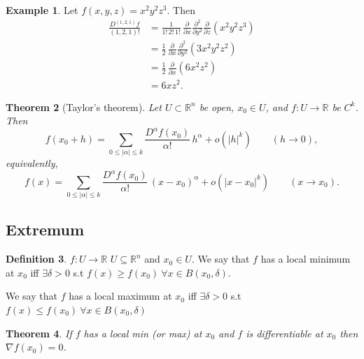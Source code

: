 \documentclass[11pt,a4paper]{article}
\theoremstyle{definition}
\newtheorem{definition}{Definition}[section]
\newtheorem{example}[definition]{Example}
\theoremstyle{plain}
\newtheorem{theorem}[definition]{Theorem}
\theoremstyle{remark}
\newcommand{\R}{\mathbb{R}}
\begin{document}
\begin{example}
Let $f(x,y,z)=x^2y^2z^3$. Then
\begin{align*}
\frac{D^{(1,2,1)}f}{(1,2,1)!}
&=\frac{1}{1!\,2!\,1!}\,
\frac{\partial}{\partial x}\frac{\partial^2}{\partial y^2}\frac{\partial}{\partial z}(x^2y^2z^3)\\
&=\frac{1}{2}\,\frac{\partial}{\partial x}\frac{\partial^2}{\partial y^2}(3x^2y^2z^2)\\
&=\frac{1}{2}\,\frac{\partial}{\partial x}(6x^2z^2)\\
&=6xz^2.
\end{align*}
\end{example}

\begin{theorem}[Taylor's theorem]
Let $U\subset\R^n$ be open, $x_0\in U$, and $f:U\to\R$ be $C^k$. Then
\[
f(x_0+h)=\sum_{0\le |\alpha|\le k}\frac{D^\alpha f(x_0)}{\alpha!}\,h^\alpha
+o(|h|^k)
\qquad (h\to 0),
\]
equivalently,
\[
f(x)=\sum_{0\le |\alpha|\le k}\frac{D^\alpha f(x_0)}{\alpha!}\,(x-x_0)^\alpha
+o(|x-x_0|^k)
\qquad (x\to x_0).
\]
\end{theorem}

\subsection{Extremum}
\begin{definition}
    $f \colon U \to \R$ $U \subseteq \R^n$ and $x_0 \in U$. We say that $f$ has a local minimum at $x_0$ iff 
    $\exists \delta > 0$ s.t $f(x) \ge f(x_0) \ \forall x \in B(x_0, \delta)$.

    We say that $f$ has a local maximum at $x_0$ iff $\exists \delta > 0$ s.t 
    $f(x) \le f(x_0) \ \forall x \in B(x_0, \delta)$
\end{definition}

\begin{theorem}
    If $f$ has a local min (or max) at $x_0$ and $f$ is differentiable at $x_0$ then $\nabla f(x_0) = 0$.
\end{theorem}
\end{document}
